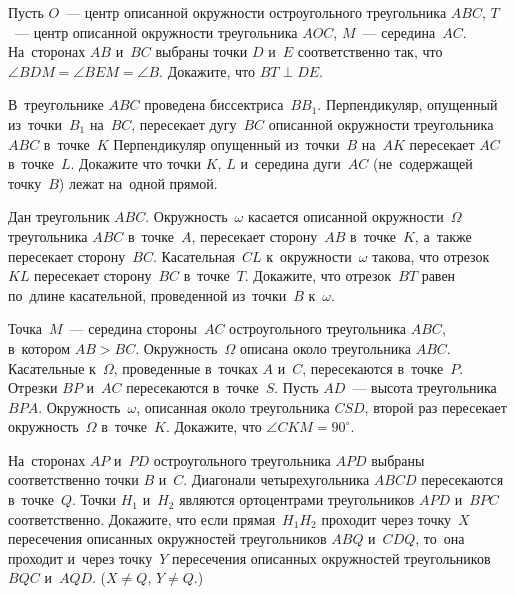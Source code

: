 


\begin{problems}

\item
Пусть $O$~--- центр описанной окружности остроугольного треугольника $ABC$,
$T$~--- центр описанной окружности треугольника $AOC$, $M$~--- середина~$AC$.
На~сторонах $AB$ и~$BC$ выбраны точки $D$ и~$E$ соответственно так, что
$\angle BDM = \angle BEM = \angle B$.
Докажите, что $BT \perp DE$.

\item
В~треугольнике $ABC$ проведена биссектриса~$BB_{1}$.
Перпендикуляр, опущенный из~точки~$B_{1}$ на~$BC$, пересекает дугу~$BC$
описанной окружности треугольника $ABC$ в~точке~$K$
Перпендикуляр опущенный из~точки~$B$ на~$AK$ пересекает $AC$ в~точке~$L$.
Докажите что точки $K$, $L$ и~середина дуги~$AC$ (не~содержащей точку~$B$)
лежат на~одной прямой.

\item
Дан треугольник $ABC$.
Окружность~$\omega$ касается описанной окружности~$\Omega$ треугольника $ABC$
в~точке~$A$, пересекает сторону~$AB$ в~точке~$K$, а~также пересекает
сторону~$BC$.
Касательная~$CL$ к~окружности~$\omega$ такова, что отрезок~$KL$ пересекает
сторону~$BC$ в~точке~$T$.
Докажите, что отрезок~$BT$ равен по~длине касательной, проведенной из~точки~$B$
к~$\omega$.

\item
Точка~$M$~--- середина стороны~$AC$ остроугольного треугольника $ABC$,
в~котором $AB > BC$.
Окружность~$\Omega$ описана около треугольника $ABC$.
Касательные к~$\Omega$, проведенные в~точках $A$ и~$C$, пересекаются
в~точке~$P$.
Отрезки $BP$ и~$AC$ пересекаются в~точке~$S$.
Пусть $AD$~--- высота треугольника $BPA$.
Окружность~$\omega$, описанная около треугольника $CSD$, второй раз пересекает
окружность~$\Omega$ в~точке~$K$.
Докажите, что $\angle CKM = 90^\circ$.

\item
На~сторонах $AP$ и~$PD$ остроугольного треугольника $APD$ выбраны
соответственно точки $B$ и~$C$.
Диагонали четырехугольника $ABCD$ пересекаются в~точке~$Q$.
Точки $H_{1}$ и~$H_{2}$ являются ортоцентрами треугольников $APD$ и~$BPC$
соответственно.
Докажите, что если прямая~$H_{1}H_{2}$ проходит через точку~$X$ пересечения
описанных окружностей треугольников $ABQ$ и~$CDQ$, то~она проходит и~через
точку~$Y$ пересечения описанных окружностей треугольников $BQC$ и~$AQD$.
($X \neq Q$, $Y \neq Q$.)

\end{problems}

